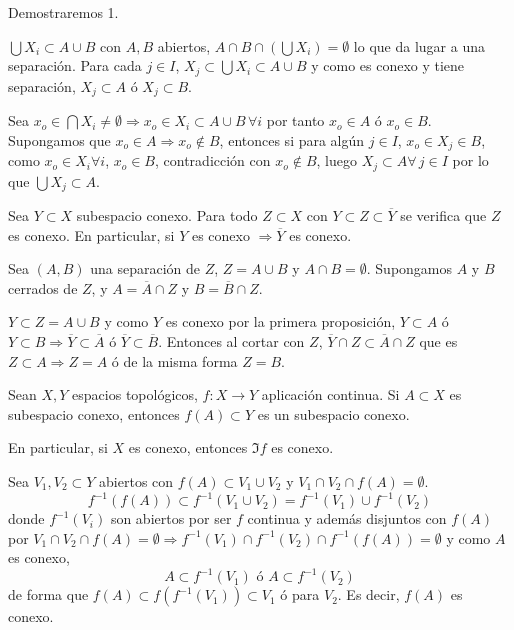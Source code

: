 \begin{dem} Demostraremos 1.

    $\bigcup X_i \subset A \cup B$ con $A,B$ abiertos, $A\cap B \cap (\bigcup X_i) = \emptyset$ lo que da lugar a una separaci\'on. Para cada $j\in I$, $X_j \subset \bigcup X_i \subset A \cup B$ y como es conexo y tiene separaci\'on, $X_j \subset A$ \'o $X_j \subset B$. 

    Sea $x_o \in \bigcap X_i \neq \emptyset \Rightarrow x_o \in X_i\subset A \cup B \, \forall i$ por tanto $x_o \in A$ \'o $x_o \in B$. Supongamos que $x_o \in A \Rightarrow x_o \nin B$, entonces si para alg\'un $j\in I$, $x_o \in X_j \in B$, como $x_o \in X_i \forall i$, $x_o \in B$, contradicci\'on con $x_o \nin B$, luego $X_j \subset A \forall \, j\in I$ por lo que $\bigcup X_j \subset A$. 
\end{dem}
\begin{prop}
    Sea $Y \subset X$ subespacio conexo. Para todo $Z\subset X$ con $Y\subset Z \subset \overline{Y}$ se verifica que $Z$ es conexo. En particular, si $Y$ es conexo $\Rightarrow \overline{Y}$ es conexo.
\end{prop}
\begin{dem}
    Sea $(A,B)$ una separaci\'on de $Z$, $Z = A\cup B$ y $A\cap B=\emptyset$. Supongamos $A$ y $B$ cerrados de $Z$, y $A = \overline{A} \cap Z$ y $B = \overline{B}\cap Z$. 
    
    $Y \subset Z = A\cup B$ y como $Y$ es conexo por la primera proposici\'on, $Y \subset A$ \'o $Y \subset B\Rightarrow \overline{Y} \subset \overline{A}$ \'o $\overline{Y} \subset \overline{B}$. Entonces al cortar con $Z$, $\overline{Y}\cap Z \subset \overline{A} \cap Z$ que es $Z \subset A \Rightarrow Z=A$ \'o de la misma forma $Z=B$.  
\end{dem}
\begin{prop}
    Sean $X,Y$ espacios topol\'ogicos, $f: X \longrightarrow Y$ aplicaci\'on continua. Si $A\subset X$ es subespacio conexo, entonces $f(A) \subset Y$ es un subespacio conexo. 

    En particular, si $X$ es conexo, entonces $\Im f$ es conexo.
\end{prop}
\begin{dem}
    Sea $V_1, V_2 \subset Y$ abiertos con $f(A) \subset V_1 \cup V_2$ y $V_1 \cap V_2 \cap f(A) = \emptyset$. 
    $$f^{-1}(f(A)) \subset f^{-1}(V_1 \cup V_2) = f^{-1}(V_1) \cup f^{-1}(V_2)$$
    donde $f^{-1}(V_i)$ son abiertos por ser $f$ continua y adem\'as disjuntos con $f(A)$ por $V_1 \cap V_2 \cap f(A) =\emptyset \Rightarrow f^{-1}(V_1) \cap  f^{-1}(V_2)\cap f^{-1}(f(A)) = \emptyset$ y como $A$ es conexo, 
    $$A \subset f^{-1}(V_1) \text{ \'o } A \subset f^{-1}(V_2) $$
    de forma que $f(A)\subset f( f^{-1}(V_1) )\subset V_1$ \'o para $V_2$. Es decir, $f(A)$ es conexo. 
\end{dem}
